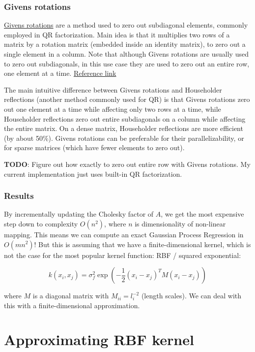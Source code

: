 \documentclass[a4paper]{article}
\begin{document}
\subsubsection*{Givens rotations}

\href{https://en.wikipedia.org/wiki/Givens_rotation}{Givens rotations} are a method used to zero out subdiagonal elements, commonly employed in QR factorization. Main idea is that it multiplies two rows of a matrix by a rotation matrix (embedded inside an identity matrix), to zero out a single element in a column. Note that although Givens rotations are usually used to zero out subdiagonals, in this use case they are used to zero out an entire row, one element at a time. \href{http://drsfenner.org/blog/2016/03/givens-rotations-and-qr/}{Reference link}

The main intuitive difference between Givens rotations and Householder reflections (another method commonly used for QR) is that Givens rotations zero out one element at a time while affecting only two rows at a time, while Householder reflections zero out entire subdiagonals on a column while affecting the entire matrix. On a dense matrix, Householder reflections are more efficient (by about 50\%). Givens rotations can be preferable for their parallelizability, or for sparse matrices (which have fewer elements to zero out).  

\textbf{TODO}: Figure out how exactly to zero out entire row with Givens rotations. My current implementation just uses built-in QR factorization.

\subsubsection*{Results}

By incrementally updating the Cholesky factor of $A$, we get the most expensive step down to complexity $O(n^2)$, where $n$ is dimensionality of non-linear mapping. This means we can compute an exact Gaussian Process Regression in $O(mn^2)$! But this is assuming that we have a finite-dimensional kernel, which is not the case for the most popular kernel function: RBF / squared exponential:

$$k(x_i, x_j) = \sigma_f^2 \exp(-\frac{1}{2}(x_i-x_j)^T M (x_i-x_j))$$

where $M$ is a diagonal matrix with $M_{ii}=l_i^{-2}$ (length scales). We can deal with this with a finite-dimensional approximation.

\section{Approximating RBF kernel}
\end{document}
